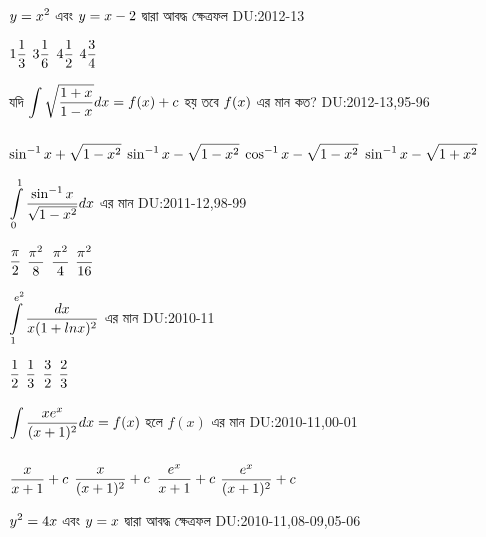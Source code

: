 \documentclass[addpoints]{exam}
\begin{document}
\begin{questions}
\question  $\mathlarger{y=x^{2}}$ এবং $\mathlarger{y=x-2}$  দ্বারা আবদ্ধ ক্ষেত্রফল \hfill \textsc{DU:2012-13}

\begin{oneparchoices}
 \choice $\mathlarger{1\frac{1}{3}}$
 \choice $\mathlarger{3\frac{1}{6}}$
 \choice $\mathlarger{4\frac{1}{2}}$
 \choice $\mathlarger{4\frac{3}{4}}$
\end{oneparchoices}

\question যদি  $\mathlarger{\int\limits_{}^{} \sqrt{\frac{1+x}{1-x}} dx= f(x) +c}$ হয় তবে $\mathlarger{f(x)}$ এর মান কত?  \hfill \textsc{DU:2012-13,95-96}


\begin{oneparchoices}
 \choice $\mathlarger{\sin^{-1}x + \sqrt{1-x^2}}$
 \choice $\mathlarger{\sin^{-1}x - \sqrt{1-x^2}}$
 \choice $\mathlarger{\cos^{-1}x - \sqrt{1-x^2}}$
 \choice $\mathlarger{\sin^{-1}x - \sqrt{1+x^2}}$
\end{oneparchoices}

\question  $\mathlarger{\int\limits_{0}^{1} \frac{\sin ^{-1}x}{\sqrt{1-x^2}}} dx$ এর মান  \hfill \textsc{DU:2011-12,98-99}

\begin{oneparchoices}
 \choice $\mathlarger{\frac{\pi}{2}}$
 \choice $\mathlarger{\frac{\pi^{2}}{8}}$
 \choice $\mathlarger{\frac{\pi ^ 2}{4}}$
 \choice $\mathlarger{\frac{\pi ^ 2}{16}}$
\end{oneparchoices}

\question  $\mathlarger{\int\limits_{1}^{e^{2}} \frac{dx}{x(1+lnx)^2}}$  এর মান \hfill \textsc{DU:2010-11}

\begin{oneparchoices}
 \choice $\mathlarger{\frac{1}{2}}$
 \choice $\mathlarger{\frac{1}{3}}$
 \choice $\mathlarger{\frac{3}{2}}$
 \choice $\mathlarger{\frac{2}{3}}$
\end{oneparchoices}

\question  $\mathlarger{\int\limits_{}^{} \frac{xe^{x}}{(x+1)^2}dx = f(x)}$  হলে $f(x)$ এর মান  \hfill \textsc{DU:2010-11,00-01}

\begin{oneparchoices}
 \choice $\mathlarger{\frac{x}{x+1} +c}$
 \choice $\mathlarger{\frac{x}{(x+1)^2} +c}$
 \choice $\mathlarger{\frac{e^x}{x+1} +c}$
\choice $\mathlarger{\frac{e^x}{(x+1)^2} +c}$
\end{oneparchoices}

\question  $\mathlarger{y^{2}=4x}$  এবং $\mathlarger{y=x}$  দ্বারা আবদ্ধ ক্ষেত্রফল  \hfill \textsc{DU:2010-11,08-09,05-06}


\end{questions}
\end{document}
